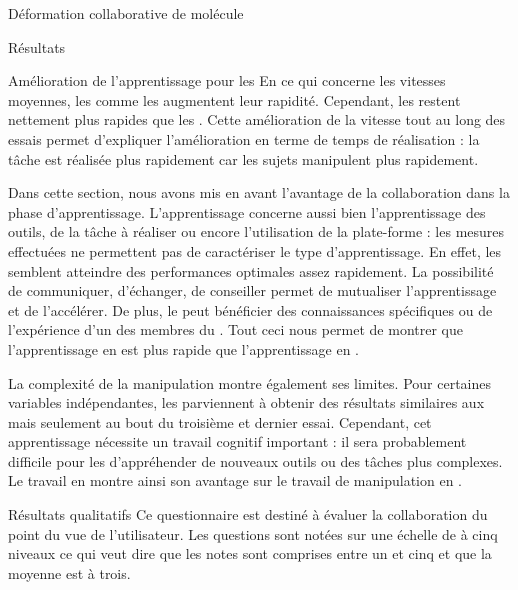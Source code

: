 \documentclass[myfrancais]{mythesis}
\begin{document}
\begin{mychapter}{Déformation collaborative de molécule}
\begin{mysection}{Résultats}
\begin{mysubsection}{Amélioration de l'apprentissage pour les }
				En ce qui concerne les vitesses moyennes, les  comme les  augmentent leur rapidité.
				Cependant, les  restent nettement plus rapides que les .
				Cette amélioration de la vitesse tout au long des essais permet d'expliquer l'amélioration en terme de temps de réalisation : la tâche est réalisée plus rapidement car les sujets manipulent plus rapidement.

				Dans cette section, nous avons mis en avant l'avantage de la collaboration dans la phase d'apprentissage.
				L'apprentissage concerne aussi bien l'apprentissage des outils, de la tâche à réaliser ou encore l'utilisation de la plate-forme : les mesures effectuées ne permettent pas de caractériser le type d'apprentissage.
				En effet, les  semblent atteindre des performances optimales assez rapidement.
				La possibilité de communiquer, d'échanger, de conseiller permet de mutualiser l'apprentissage et de l'accélérer.
				De plus, le  peut bénéficier des connaissances spécifiques ou de l'expérience d'un des membres du .
				Tout ceci nous permet de montrer que l'apprentissage en  est plus rapide que l'apprentissage en .

				La complexité de la manipulation  montre également ses limites.
				Pour certaines variables indépendantes, les  parviennent à obtenir des résultats similaires aux  mais seulement au bout du troisième et dernier essai.
				Cependant, cet apprentissage nécessite un travail cognitif important : il sera probablement difficile pour les  d'appréhender de nouveaux outils ou des tâches plus complexes.
				Le travail en  montre ainsi son avantage sur le travail de manipulation  en .
			\end{mysubsection}
			\begin{mysubsection}{Résultats qualitatifs}
				Ce questionnaire est destiné à évaluer la collaboration du point du vue de l'utilisateur.
				Les questions sont notées sur une échelle de  à cinq niveaux ce qui veut dire que les notes sont comprises entre un et cinq et que la moyenne est à trois.


\end{mysubsection}
\end{mysection}
\end{mychapter}
\end{document}
